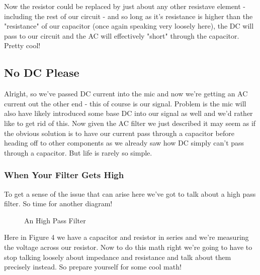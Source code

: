 \documentclass[10pt,a5paper]{book}
\begin{document}
Now the resistor could be replaced by just about any other resistave element - including the rest of our circuit - and so long as it's resistance is higher than the "resistance" of our capacitor (once again speaking very loosely here), the DC will pass to our circuit and the AC will effectively "short" through the capacitor. Pretty cool! 

\subsection{No DC Please}

Alright, so we've passed DC current into the mic and now we're getting an AC current out the other end - this of course is our signal. Problem is the mic will also have likely introduced some base DC into our signal as well and we'd rather like to get rid of this. Now given the AC filter we just described it may seem as if the obvious solution is to have our current pass through a capacitor before heading off to other components as we already saw how DC simply can't pass through a capacitor. But life is rarely so simple. 

\subsubsection{When Your Filter Gets High}

To get a sense of the issue that can arise here we've got to talk about a high pass filter. So time for another diagram!

\begin{figure}[!htb]
\caption{\label{fig:my-label} An High Pass Filter}
\end{figure}

Here in Figure 4 we have a capacitor and resistor in series and we're measuring the voltage across our resistor. Now to do this math right we're going to have to stop talking loosely about impedance and resistance and talk about them precisely instead. So prepare yourself for some cool math! 
\end{document}
